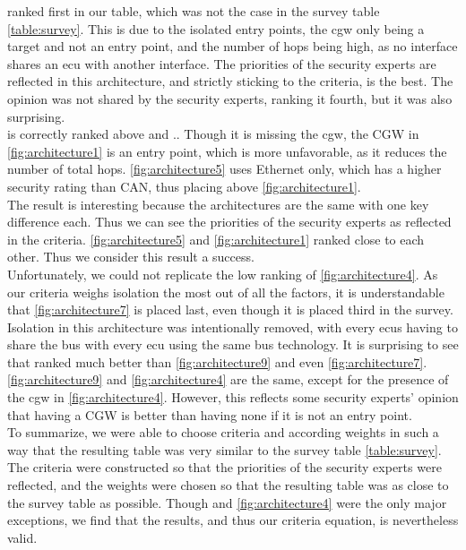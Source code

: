  ranked first in our table, which was not the case in the survey table \ref{table:survey}.
This is due to the isolated entry points, the \acrshort{cgw} only being a target and not an entry point, 
and the number of hops being high, as no interface shares an \acrshort{ecu} with another interface.
The priorities of the security experts are reflected in this architecture, and
strictly sticking to the criteria,  is the best.
The opinion was not shared by the security experts, ranking it fourth, but it was also surprising.\\

 is correctly ranked above  and ..
Though it is missing the \acrshort{cgw}, the CGW in \ref{fig:architecture1} is an entry point, which is more unfavorable, as it reduces the number of total hops.
\ref{fig:architecture5} uses Ethernet only, which has a higher security rating than CAN, thus placing above \ref{fig:architecture1}.\\
The result is interesting because the architectures are the same with one key difference each. Thus we can see the priorities of the security experts
as reflected in the criteria.
\ref{fig:architecture5} and \ref{fig:architecture1} ranked close to each other. Thus we consider this result a success.\\

Unfortunately, we could not replicate the low ranking of \ref{fig:architecture4}.
As our criteria weighs isolation the most out of all the factors, it is understandable that \ref{fig:architecture7} is placed last,
even though it is placed third in the survey.
Isolation in this architecture was intentionally removed, with every \acrshort{ecu}s having to share the bus with every \acrshort{ecu} using the same bus technology.
It is surprising to see that  ranked much better than \ref{fig:architecture9} and even \ref{fig:architecture7}.
\ref{fig:architecture9} and \ref{fig:architecture4} are the same, except for the presence of the \acrshort{cgw} in \ref{fig:architecture4}.
However, this reflects some security experts' opinion that having a CGW is better than having none if it is not an entry point.\\

To summarize, we were able to choose criteria and according weights in such a way that the resulting table 
was very similar to the survey table \ref{table:survey}.
The criteria were constructed so that the priorities of the security experts were reflected, 
and the weights were chosen so that the resulting table was as close to the survey table as possible.
Though  and \ref{fig:architecture4} were the only major exceptions, 
we find that the results, and thus our criteria equation, is nevertheless valid.\\